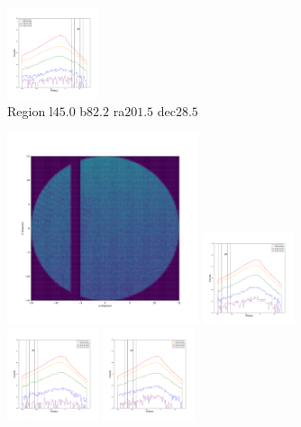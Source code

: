 \documentclass[12pt,prd]{article}
\begin{document}
\begin{figure}[h!]
\includegraphics[width=0.24\textwidth]{../figures/scanning_plotsgaiascan_l45_0_b82_2_ra201_5_dec28_5_npy_16.pdf}
\caption{Region l$45.0$ b$82.2$ ra$201.5$ dec$28.5$}
\end{figure}

\begin{figure}[h!]
\centering
\includegraphics[width=0.5\textwidth]{../figures/histogram2dgaiascan_l67_5_b74_4_ra208_6_dec35_1_npy.pdf}
\includegraphics[width=0.24\textwidth]{../figures/scanning_plotsgaiascan_l67_5_b74_4_ra208_6_dec35_1_npy_0.pdf}
\includegraphics[width=0.24\textwidth]{../figures/scanning_plotsgaiascan_l67_5_b74_4_ra208_6_dec35_1_npy_1.pdf}
\includegraphics[width=0.24\textwidth]{../figures/scanning_plotsgaiascan_l67_5_b74_4_ra208_6_dec35_1_npy_2.pdf}

\end{figure}
\end{document}
